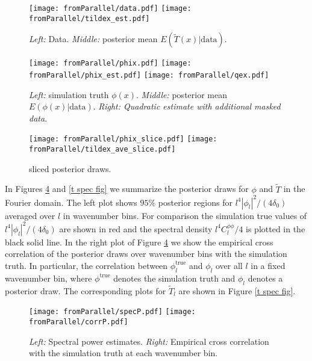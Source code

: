 \documentclass[noinfoline]{imsart}
\begin{document}
\begin{figure}[h]
{\texttt{[image: fromParallel/data.pdf]}}%
{\texttt{[image: fromParallel/tildex\_est.pdf]}}%
\caption{{\em Left:} Data. {\em Middle:} posterior mean $E(\widetilde T(x)|\text{data})$.
 }
\label{tilde fig}
\end{figure}


\begin{figure}[h]
{\texttt{[image: fromParallel/phix.pdf]}}%
{\texttt{[image: fromParallel/phix\_est.pdf]}}%
{\texttt{[image: fromParallel/qex.pdf]}}%
\caption{{\em Left:} simulation truth $\phi(x)$. {\em Middle:} posterior mean $E(\phi(x)|\text{data})$. {\em Right: Quadratic estimate with additional masked data.}}
\label{phix fig}
\end{figure}


\begin{figure}[h]
{\texttt{[image: fromParallel/phix\_slice.pdf]}}%
{\texttt{[image: fromParallel/tildex\_ave\_slice.pdf]}}
\caption{sliced posterior draws.}
\label{slice fig}
\end{figure}



In Figures \ref{p spec fig} and \ref{t spec fig} we summarize the posterior draws for $\phi$ and $\widetilde T$ in the Fourier domain. The left plot shows $95\%$ posterior regions for  $l^4|\phi_l|^2/(4\delta_0)$  averaged over $l$ in wavenumber bins. For comparison the simulation true values of  $l^4|\phi_l|^2/(4\delta_0)$ are shown in red and the spectral density $l^4 C^{\phi\phi}_l/4$ is plotted in the black solid line. In the right plot of Figure \ref{p spec fig} we show the empirical cross correlation of the posterior draws over wavenumber bins with the simulation truth. In particular, the correlation between $\phi^\text{true}_l$ and  $\phi_l$ over all $l$  in a fixed wavenumber bin, where $\phi^\text{true}$ denotes the simulation truth and $\phi_l$ denotes a posterior draw.  The corresponding plots for $\widetilde T_l$ are shown in Figure \ref{t spec fig}.




\begin{figure}[h]
{\texttt{[image: fromParallel/specP.pdf]}}%
{\texttt{[image: fromParallel/corrP.pdf]}}
\caption{{\em Left:} Spectral power estimates. {\em Right:} Empirical cross correlation with the simulation truth at each wavenumber bin.}
\label{p spec fig}
\end{figure}
\end{document}
